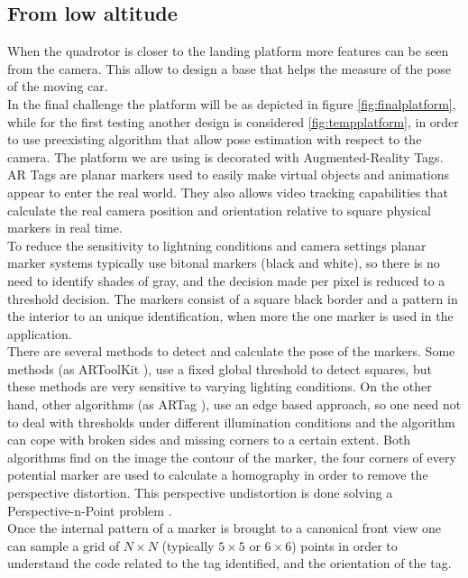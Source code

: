 \subsection{From low altitude}
When the quadrotor is closer to the landing platform more features can be seen from the camera. This allow to design a base that helps the measure of the pose of the moving car.\\
In the final challenge \label{chap:thechallenge} the platform will be as depicted in figure \ref{fig:finalplatform}, while for the first testing another design is considered \ref{fig:tempplatform}, in order to use preexisting algorithm that allow pose estimation with respect to the camera. The platform we are using is decorated with Augmented-Reality Tags. AR Tags are planar markers used to easily make virtual objects and animations appear to enter the real world. They also allows video tracking capabilities that calculate the real camera position and orientation relative to square physical markers in real time. \\
To reduce the sensitivity to lightning conditions and camera settings planar marker systems typically use bitonal markers (black and white), so there is no need to identify shades of gray, and the decision made per pixel is reduced to a threshold decision. The markers consist of a square black border and a pattern in the interior to an unique identification, when more the one marker is used in the application.\\
There are several methods to detect and calculate the pose of the markers. Some methods (as ARToolKit \cite{kato1999marker}), use a fixed global threshold to detect squares, but these methods are very sensitive to varying lighting conditions. On the other hand, other algorithms (as ARTag \cite{fiala2010designing}), use an edge based approach, so one need not to deal with thresholds under different illumination conditions and the algorithm can cope with broken sides and missing corners to a certain extent. 
Both algorithms find on the image the contour of the marker, the four corners of every potential marker are used to calculate a homography in order to remove the perspective distortion. This perspective undistortion is done solving a Perspective-n-Point problem \cite{quan1999linear}.\\
Once the internal pattern of a marker is brought to a canonical front view one can sample a grid of $N \times N$ (typically $5 \times 5$ or $6 \times 6$) points in order to understand the code related to the tag identified, and the orientation of the tag.

